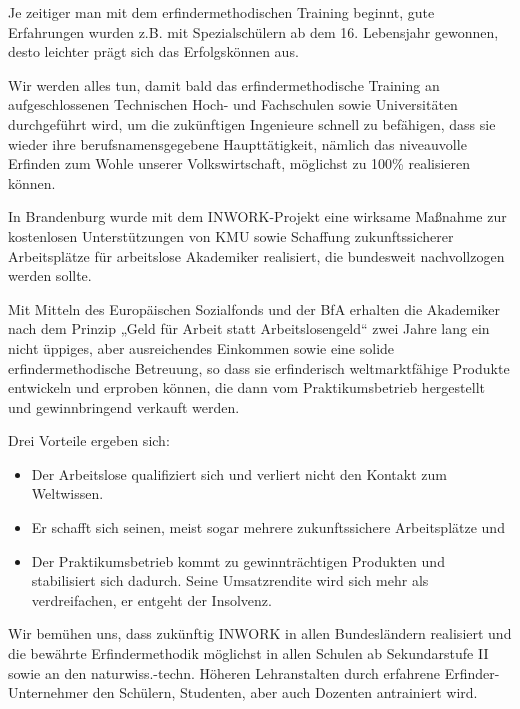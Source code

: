 \documentclass[11pt,a4paper]{article}
\begin{document}
Je zeitiger man mit dem erfindermethodischen Training beginnt, gute
Erfahrungen wurden z.B. mit Spezialschülern ab dem 16. Lebensjahr gewonnen,
desto leichter prägt sich das Erfolgskönnen aus.

Wir werden alles tun, damit bald das erfindermethodische Training an
aufgeschlossenen Technischen Hoch- und Fachschulen sowie Universitäten
durchgeführt wird, um die zukünftigen Ingenieure schnell zu befähigen, dass
sie wieder ihre berufsnamensgegebene Haupttätigkeit, nämlich das niveauvolle
Erfinden zum Wohle unserer Volkswirtschaft, möglichst zu 100\% realisieren
können.

In Brandenburg wurde mit dem INWORK-Projekt eine wirksame Maßnahme zur
kostenlosen Unterstützungen von KMU sowie Schaffung zukunftssicherer
Arbeitsplätze für arbeitslose Akademiker realisiert, die bundesweit
nachvollzogen werden sollte.

Mit Mitteln des Europäischen Sozialfonds und der BfA erhalten die Akademiker
nach dem Prinzip „Geld für Arbeit statt Arbeitslosengeld“ zwei Jahre lang ein
nicht üppiges, aber ausreichendes Einkommen sowie eine solide
erfindermethodische Betreuung, so dass sie erfinderisch weltmarktfähige
Produkte entwickeln und erproben können, die dann vom Praktikumsbetrieb
hergestellt und gewinnbringend verkauft werden.

Drei Vorteile ergeben sich:
\begin{itemize}[noitemsep]
\item Der Arbeitslose qualifiziert sich und verliert nicht den Kontakt zum
  Weltwissen.
\item Er schafft sich seinen, meist sogar mehrere zukunftssichere
  Arbeitsplätze und
\item Der Praktikumsbetrieb kommt zu gewinnträchtigen Produkten und
  stabilisiert sich dadurch. Seine Umsatzrendite wird sich mehr als
  verdreifachen, er entgeht der Insolvenz.
\end{itemize}
Wir bemühen uns, dass zukünftig INWORK in allen Bundesländern realisiert und
die bewähr\-te Erfindermethodik möglichst in allen Schulen ab Sekundarstufe II
sowie an den naturwiss.-techn. Höheren Lehranstalten durch erfahrene
Erfinder-Unternehmer den Schülern, Studenten, aber auch Dozenten antrainiert
wird.
\end{document}

